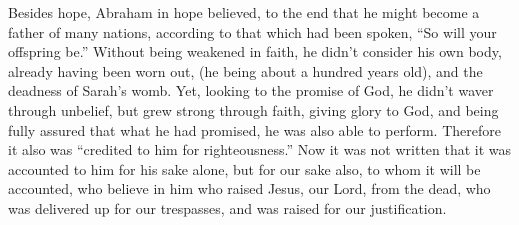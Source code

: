 {Besides hope, Abraham in hope believed, to the end that he might become a father of many nations, according to that which had been spoken, “So will your offspring be.”
Without being weakened in faith, he didn’t consider his own body, already having been worn out, (he being about a hundred years old), and the deadness of Sarah’s womb.
Yet, looking to the promise of God, he didn’t waver through unbelief, but grew strong through faith, giving glory to God,
and being fully assured that what he had promised, he was also able to perform.
Therefore it also was “credited to him for righteousness.”
Now it was not written that it was accounted to him for his sake alone,
but for our sake also, to whom it will be accounted, who believe in him who raised Jesus, our Lord, from the dead,
who was delivered up for our trespasses, and was raised for our justification.

}
